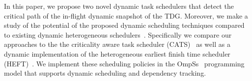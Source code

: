 In this paper, we propose two novel dynamic task schedulers that detect the critical path of the in-flight dynamic snapshot of the TDG. 
Moreover, we make a study of the potential of the proposed dynamic scheduling techniques compared to existing dynamic heterogeneous schedulers~\cite{Chronaki:ICS2015,HEFT}.
Specifically we compare our approaches to the the criticality aware task scheduler (CATS)~\cite{Chronaki:ICS2015} as well as a dynamic implementation of the heterogeneous earliest finish time scheduler (HEFT)~\cite{HEFT}.
We implement these scheduling policies in the OmpSs~\cite{OmpSs_PPL11,OmpSs} programming model that supports dynamic scheduling and dependency tracking.



